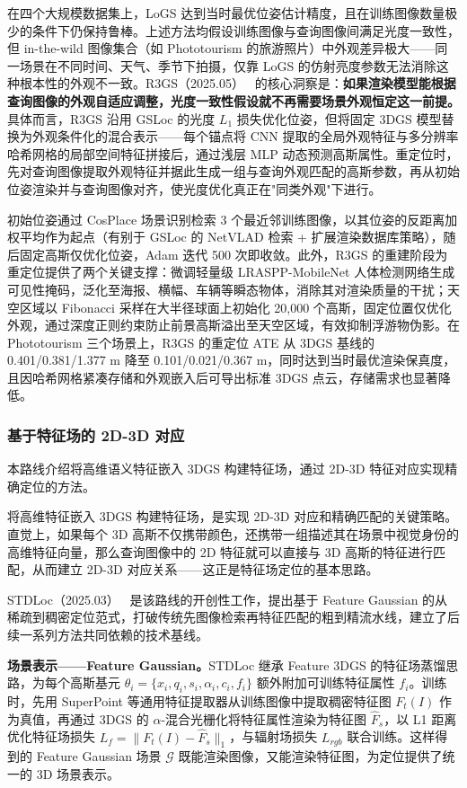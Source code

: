 在四个大规模数据集上，LoGS 达到当时最优位姿估计精度，且在训练图像数量极少的条件下仍保持鲁棒。上述方法均假设训练图像与查询图像间满足光度一致性，但 in-the-wild 图像集合（如 Phototourism 的旅游照片）中外观差异极大——同一场景在不同时间、天气、季节下拍摄，仅靠 LoGS 的仿射亮度参数无法消除这种根本性的外观不一致。R3GS（2025.05）~\cite{2505_15294} 的核心洞察是：\textbf{如果渲染模型能根据查询图像的外观自适应调整，光度一致性假设就不再需要场景外观恒定这一前提。}具体而言，R3GS 沿用 GSLoc 的光度 $L_1$ 损失优化位姿，但将固定 3DGS 模型替换为外观条件化的混合表示——每个锚点将 CNN 提取的全局外观特征与多分辨率哈希网格的局部空间特征拼接后，通过浅层 MLP 动态预测高斯属性。重定位时，先对查询图像提取外观特征并据此生成一组与查询外观匹配的高斯参数，再从初始位姿渲染并与查询图像对齐，使光度优化真正在"同类外观"下进行。

初始位姿通过 CosPlace 场景识别检索 3 个最近邻训练图像，以其位姿的反距离加权平均作为起点（有别于 GSLoc 的 NetVLAD 检索 + 扩展渲染数据库策略），随后固定高斯仅优化位姿，Adam 迭代 500 次即收敛。此外，R3GS 的重建阶段为重定位提供了两个关键支撑：微调轻量级 LRASPP-MobileNet 人体检测网络生成可见性掩码，泛化至海报、横幅、车辆等瞬态物体，消除其对渲染质量的干扰；天空区域以 Fibonacci 采样在大半径球面上初始化 20,000 个高斯，固定位置仅优化外观，通过深度正则约束防止前景高斯溢出至天空区域，有效抑制浮游物伪影。在 Phototourism 三个场景上，R3GS 的重定位 ATE 从 3DGS 基线的 0.401/0.381/1.377 m 降至 0.101/0.021/0.367 m，同时达到当时最优渲染保真度，且因哈希网格紧凑存储和外观嵌入后可导出标准 3DGS 点云，存储需求也显著降低。

\subsubsection{基于特征场的 2D-3D 对应}

本路线介绍将高维语义特征嵌入 3DGS 构建特征场，通过 2D-3D 特征对应实现精确定位的方法。

将高维特征嵌入 3DGS 构建特征场，是实现 2D-3D 对应和精确匹配的关键策略。直觉上，如果每个 3D 高斯不仅携带颜色，还携带一组描述其在场景中视觉身份的高维特征向量，那么查询图像中的 2D 特征就可以直接与 3D 高斯的特征进行匹配，从而建立 2D-3D 对应关系——这正是特征场定位的基本思路。

STDLoc（2025.03）~\cite{2503_19358} 是该路线的开创性工作，提出基于 Feature Gaussian 的从稀疏到稠密定位范式，打破传统先图像检索再特征匹配的粗到精流水线，建立了后续一系列方法共同依赖的技术基线。

\textbf{场景表示——Feature Gaussian。}STDLoc 继承 Feature 3DGS 的特征场蒸馏思路，为每个高斯基元 $\theta_i = \{x_i, q_i, s_i, \alpha_i, c_i, f_i\}$ 额外附加可训练特征属性 $f_i$。训练时，先用 SuperPoint 等通用特征提取器从训练图像中提取稠密特征图 $F_t(I)$ 作为真值，再通过 3DGS 的 $\alpha$-混合光栅化将特征属性渲染为特征图 $\hat{F}_s$，以 L1 距离优化特征场损失 $L_f = \|F_t(I) - \hat{F}_s\|_1$，与辐射场损失 $L_{rgb}$ 联合训练。这样得到的 Feature Gaussian 场景 $\mathcal{G}$ 既能渲染图像，又能渲染特征图，为定位提供了统一的 3D 场景表示。

